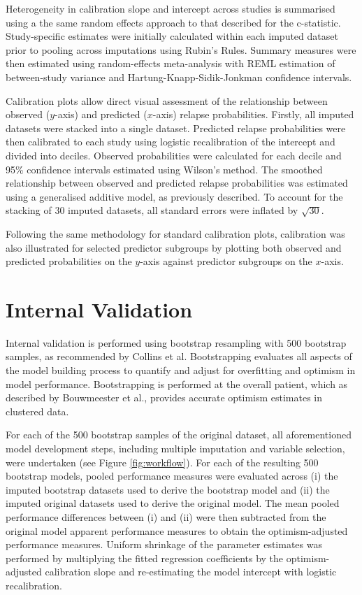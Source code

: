 Heterogeneity in calibration slope and intercept across studies is summarised using a the same random effects approach to that described for the c-statistic. Study-specific estimates were initially calculated within each imputed dataset prior to pooling across imputations using Rubin's Rules\cite{burgess2013}. Summary measures were then estimated using random-effects meta-analysis with REML estimation of between-study variance and Hartung-Knapp-Sidik-Jonkman confidence intervals\cite{knapp2003}.

Calibration plots allow direct visual assessment of the relationship between observed ($y$-axis) and predicted ($x$-axis) relapse probabilities. Firstly, all imputed datasets were stacked into a single dataset. Predicted relapse probabilities were then calibrated to each study using logistic recalibration of the intercept and divided into deciles. Observed probabilities were calculated for each decile and 95\% confidence intervals estimated using Wilson's method\cite{wilson1927}. The smoothed relationship between observed and predicted relapse probabilities was estimated using a generalised additive model, as previously described. To account for the stacking of 30 imputed datasets, all standard errors were inflated by $\sqrt{30}$.

Following the same methodology for standard calibration plots, calibration was also illustrated for selected predictor subgroups by plotting both observed and predicted probabilities on the $y$-axis against predictor subgroups on the $x$-axis.

\section{Internal Validation}

Internal validation is performed using bootstrap resampling with 500 bootstrap samples, as recommended by Collins et al\cite{collins2024B}. Bootstrapping evaluates all aspects of the model building process to quantify and adjust for overfitting and optimism in model performance\cite{collins2024B}. Bootstrapping is performed at the overall patient, which as described by Bouwmeester et al., provides accurate optimism estimates in clustered data\cite{bouwmeester2013B}.

For each of the 500 bootstrap samples of the original dataset, all aforementioned model development steps, including multiple imputation and variable selection, were undertaken (see Figure \ref{fig:workflow}). For each of the resulting 500 bootstrap models, pooled performance measures were evaluated across (i) the imputed bootstrap datasets used to derive the bootstrap model and (ii) the imputed original datasets used to derive the original model. The mean pooled performance differences between (i) and (ii) were then subtracted from the original model apparent performance measures to obtain the optimism-adjusted performance measures. Uniform shrinkage of the parameter estimates was performed by multiplying the fitted regression coefficients by the optimism-adjusted calibration slope and re-estimating the model intercept with logistic recalibration.

